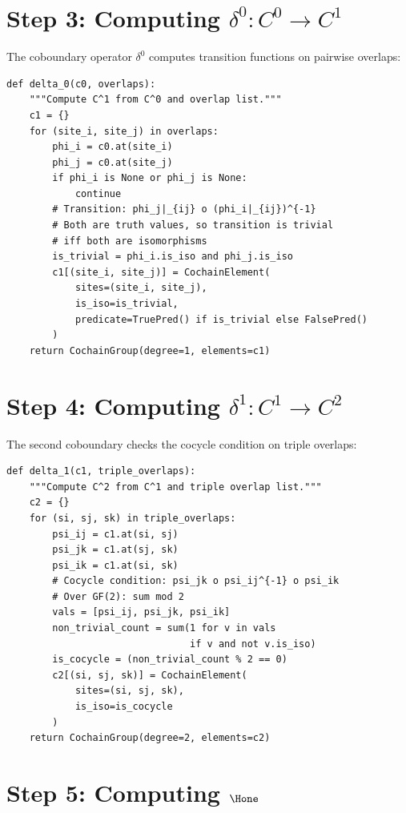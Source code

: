 \section{Step 3: Computing $\delta^0 : C^0 \to C^1$}

The coboundary operator $\delta^0$ computes transition functions
on pairwise overlaps:

\begin{lstlisting}[caption={Coboundary $\delta^0$}]
def delta_0(c0, overlaps):
    """Compute C^1 from C^0 and overlap list."""
    c1 = {}
    for (site_i, site_j) in overlaps:
        phi_i = c0.at(site_i)
        phi_j = c0.at(site_j)
        if phi_i is None or phi_j is None:
            continue
        # Transition: phi_j|_{ij} o (phi_i|_{ij})^{-1}
        # Both are truth values, so transition is trivial
        # iff both are isomorphisms
        is_trivial = phi_i.is_iso and phi_j.is_iso
        c1[(site_i, site_j)] = CochainElement(
            sites=(site_i, site_j),
            is_iso=is_trivial,
            predicate=TruePred() if is_trivial else FalsePred()
        )
    return CochainGroup(degree=1, elements=c1)
\end{lstlisting}

\section{Step 4: Computing $\delta^1 : C^1 \to C^2$}

The second coboundary checks the cocycle condition on triple overlaps:

\begin{lstlisting}[caption={Coboundary $\delta^1$}]
def delta_1(c1, triple_overlaps):
    """Compute C^2 from C^1 and triple overlap list."""
    c2 = {}
    for (si, sj, sk) in triple_overlaps:
        psi_ij = c1.at(si, sj)
        psi_jk = c1.at(sj, sk)
        psi_ik = c1.at(si, sk)
        # Cocycle condition: psi_jk o psi_ij^{-1} o psi_ik
        # Over GF(2): sum mod 2
        vals = [psi_ij, psi_jk, psi_ik]
        non_trivial_count = sum(1 for v in vals
                                if v and not v.is_iso)
        is_cocycle = (non_trivial_count % 2 == 0)
        c2[(si, sj, sk)] = CochainElement(
            sites=(si, sj, sk),
            is_iso=is_cocycle
        )
    return CochainGroup(degree=2, elements=c2)
\end{lstlisting}

\section{Step 5: Computing $\Hone$}

